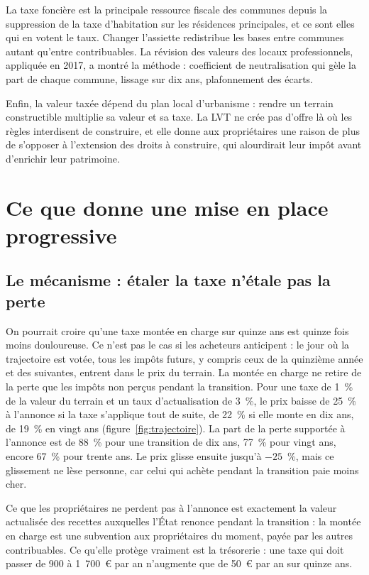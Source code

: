 \documentclass[11pt,a4paper]{article}
\begin{document}
La taxe foncière est la principale ressource fiscale des communes depuis la suppression de la
taxe d'habitation sur les résidences principales, et ce sont elles qui en votent le taux. Changer
l'assiette redistribue les bases entre communes autant qu'entre contribuables. La révision des
valeurs des locaux professionnels, appliquée en 2017, a montré la méthode : coefficient de
neutralisation qui gèle la part de chaque commune, lissage sur dix ans, plafonnement des écarts.

Enfin, la valeur taxée dépend du plan local d'urbanisme : rendre un terrain constructible
multiplie sa valeur et sa taxe. La LVT ne crée pas d'offre là où les règles interdisent de
construire, et elle donne aux propriétaires une raison de plus de s'opposer à l'extension des
droits à construire, qui alourdirait leur impôt avant d'enrichir leur patrimoine.


\section{Ce que donne une mise en place progressive}\label{sec:transition}

\subsection{Le mécanisme : étaler la taxe n'étale pas la perte}

On pourrait croire qu'une taxe montée en charge sur quinze ans est quinze fois moins douloureuse.
Ce n'est pas le cas si les acheteurs anticipent : le jour où la trajectoire est votée, tous les
impôts futurs, y compris ceux de la quinzième année et des suivantes, entrent dans le prix du
terrain. La montée en charge ne retire de la perte que les impôts non perçus pendant la
transition. Pour une taxe de 1~\% de la valeur du terrain et un taux d'actualisation de 3~\%, le
prix baisse de 25~\% à l'annonce si la taxe s'applique tout de suite, de 22~\% si elle monte en dix
ans, de 19~\% en vingt ans (figure~\ref{fig:trajectoire}). La part de la perte supportée à
l'annonce est de 88~\% pour une transition de dix ans, 77~\% pour vingt ans, encore 67~\% pour
trente ans. Le prix glisse ensuite jusqu'à $-25$~\%, mais ce glissement ne lèse personne, car celui
qui achète pendant la transition paie moins cher.


Ce que les propriétaires ne perdent pas à l'annonce est exactement la valeur actualisée des
recettes auxquelles l'État renonce pendant la transition : la montée en charge est une subvention
aux propriétaires du moment, payée par les autres contribuables. Ce qu'elle protège vraiment est la
trésorerie : une taxe qui doit passer de 900 à 1~700~€ par an n'augmente que de 50~€ par an sur
quinze ans.
\end{document}
